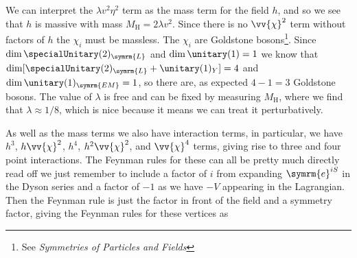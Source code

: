 \documentclass[fleqn]{NotesClass}
\newcommand*{\course}[1]{\textit{#1}}
\newcommand{\Pparticle}[1]{\mathrm{#1}}
\newcommand{\Phiggs}{\ensuremath{\Pparticle{H}}}
\newcommand{\e}{\symrm{e}}
\newcommand{\Left}{\symrm{L}}
\begin{document}
    We can interpret the \(\lambda v^2\eta^2\) term as the mass term for the field \(h\), and so we see that \(h\) is massive with mass \(M_{\Phiggs} = 2\lambda v^2\).
    Since there is no \(\vv{\chi}^2\) term without factors of \(h\) the \(\chi_i\) must be massless.
    The \(\chi_i\) are Goldstone bosons\footnote{See \course{Symmetries of Particles and Fields}}.
    Since \(\dim\specialUnitary(2)_{\Left}\) and \(\dim\unitary(1) = 1\) we know that \(\dim[\specialUnitary(2)_{\Left} + \unitary(1)_Y] = 4\) and \(\dim \unitary(1)_{\symrm{EM}} = 1\), so there are, as expected \(4 - 1 = 3\) Goldstone bosons.
    The value of \(\lambda\) is free and can be fixed by measuring \(M_{\Phiggs}\), where we find that \(\lambda \approx 1/8\), which is nice because it means we can treat it perturbatively.
    
    As well as the mass terms we also have interaction terms, in particular, we have \(h^3\), \(h\vv{\chi}^2\), \(h^4\), \(h^2\vv{\chi}^2\), and \(\vv{\chi}^4\) terms, giving rise to three and four point interactions.
    The Feynman rules for these can all be pretty much directly read off we just remember to include a factor of \(i\) from expanding \(\e^{iS}\) in the Dyson series and a factor of \(-1\) as we have \(-V\) appearing in the Lagrangian.
    Then the Feynman rule is just the factor in front of the field and a symmetry factor, giving the Feynman rules for these vertices as
\end{document}
